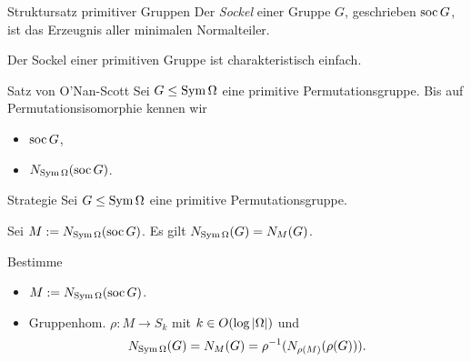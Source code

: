 \begin{frame}{Struktursatz primitiver Gruppen}
Der \emph{Sockel} einer Gruppe $G$, geschrieben
$\operatorname{soc} G$, ist das Erzeugnis aller minimalen Normalteiler.

Der Sockel einer primitiven Gruppe ist charakteristisch einfach.

\begin{block}{Satz von O'Nan-Scott}
Sei $G \leq \operatorname{Sym} \Omega$ eine primitive Permutationsgruppe.
Bis auf Permutationsisomorphie kennen wir
\begin{itemize}
\item $\operatorname{soc} G$,
\item $N_{\operatorname{Sym} \Omega}( \operatorname{soc} G )$.
\end{itemize}
\end{block}
\end{frame}


\begin{frame}{Strategie}
Sei $G \leq \operatorname{Sym} \Omega$ eine primitive Permutationsgruppe.

Sei $M := N_{\operatorname{Sym} \Omega}(\operatorname{soc} G)$.
Es gilt $N_{\operatorname{Sym} \Omega}(G) = N_M(G)$.

Bestimme
\begin{itemize}
\item $M := N_{\operatorname{Sym} \Omega}(\operatorname{soc} G)$.
\item Gruppenhom.
$
    \rho : M \to S_k
$
mit $k \in O(\log  \left| \Omega \right| )$
und
\[
    N_{\operatorname{Sym} \Omega}(G) = N_{M}(G) = \rho ^ {-1}( N_{\rho(M)}(\rho(G)) ).
\]
\end{itemize}
\end{frame}


